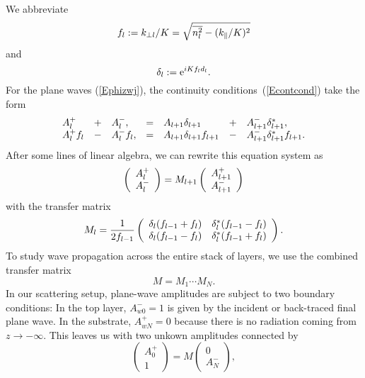 We abbreviate
\begin{equation}
  f_l := k_{\perp l}/K = \sqrt{\overline{n_l^2}-(k_\parallel/K)^2}
\end{equation}
and
\begin{equation}
   \delta_l := \text{e}^{iKf_l d_l}.
\end{equation}
For the plane waves (\ref{Ephizwj}),
the continuity conditions~(\ref{Econtcond}) take the form
\begin{equation}\label{Econt2}
  \begin{array}{lclclcl}
  A^+_l &+& A^-_l,
  &=&
  A_{l+1}\delta_{l+1} &+& A^-_{l+1}\delta_{l+1}^*,
  \\
  A^+_l f_l  &-& A^-_l f_l,
  &=&
  A_{l+1}\delta_{l+1} f_{l+1} &-& A^-_{l+1}\delta_{l+1}^* f_{l+1}.
  \end{array}
\end{equation}
After some lines of linear algebra,
we can rewrite this equation system as
\begin{equation}\label{EcMc}
  \left( \begin{array}{c}A^+_l\\A^-_l\end{array} \right)
  = M_{l+1} \left( \begin{array}{c}A^+_{l+1}\\A^-_{l+1}\end{array} \right)
\end{equation}
with the transfer matrix
\begin{equation}
  M_l
   = \frac{1}{2f_{l-1}}
   \left(\begin{array}{cc}
       \delta_l(f_{l-1}+f_l)&\delta_l^*(f_{l-1}-f_l)\\
       \delta_l(f_{l-1}-f_l)&\delta_l^*(f_{l-1}+f_l)
   \end{array}\right).
\end{equation}
To study wave propagation across the entire stack of layers,
we use the combined transfer matrix
\begin{equation}
   M = M_1 \cdots M_N.
\end{equation}
In our scattering setup,
plane-wave amplitudes are subject to two boundary conditions:
In the top layer, $A^-_{w0}=1$ is given by the
incident or back-traced final plane wave.
In the substrate, $A^+_{wN}=0$ because there is no radiation
coming from $z\to-\infty$.
This leaves us with two unkown amplitudes connected by
\begin{equation}
  \left( \begin{array}{c}A^+_0\\1\end{array} \right)
  = M \left( \begin{array}{c}0\\A^-_N\end{array} \right),
\end{equation}
